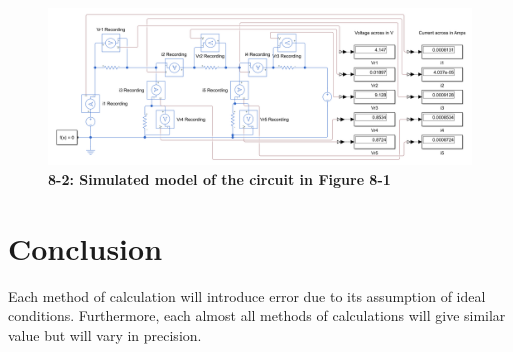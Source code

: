 \documentclass[a4paper]{article}
\begin{document}
\begin{center}
    \begin{figure}[H]\label{fig8-2}
        \begin{center}
            \includegraphics[width = 16 cm]{Figure_8-1}\\
            \small\textbf{8-2: Simulated model of the circuit in Figure 8-1}\\    
        \end{center}
    \end{figure}
\end{center}
\section{Conclusion}

Each method of calculation will introduce error due to its assumption of ideal conditions. Furthermore, each almost all methods of calculations
will give similar value but will vary in precision.




\end{document}
